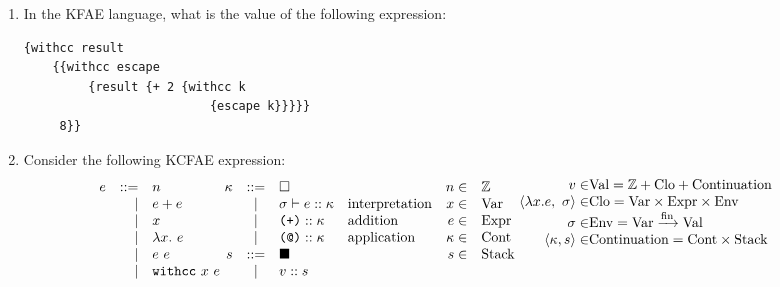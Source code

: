 \begin{enumerate}
\item In the KFAE language, what is the value of the following expression:

{
\begin{verbatim}
{withcc result
    {{withcc escape
         {result {+ 2 {withcc k
                          {escape k}}}}}
     8}}
\end{verbatim}
}

\item Consider the following KCFAE expression:
\[
\!\!\!\!\!\!\!\!
\begin{array}{l@{}l@{}l@{}l}
\begin{array}{rrl}
  e & ::= & n\\
        & | & e + e\\
        & | & x\\
        & | & \lambda x.\ e\\
        & | & e\ e\\
        & | & \mbox{\code{withcc}}\ x\ e\\
\end{array}
&
\!\!\!\!
\begin{array}{rcll}
  \kappa & ::= & \square &\\
        & | & \sigma \vdash e :: \kappa &\mbox{interpretation}\\
        & | & \mtt{(+)} :: \kappa &\mbox{addition}\\
        & | & \mtt{(@)} :: \kappa &\mbox{application}\\
s      & ::= &  \blacksquare &\mbox{}\\
        & | & v :: s &\mbox{}\\
\end{array}
&
\begin{array}{rl@{}c@{}l}
  n \in& \mathbb{Z} &&\\
  x \in& \mbox{Var} &&\\
  e \in& \mbox{Expr}&&\\
  \kappa \in& \mbox{Cont} &&\\
 s \in&\mbox{Stack}\\\\
\end{array}
&
\!\!\!\!
\begin{array}{r@{}l@{}c@{}l}
  v \in& \mbox{Val} = \mathbb{Z} + \mbox{Clo} + \mbox{Continuation}\\
\langle\lambda x. e,\ \sigma\rangle \in& \mbox{Clo} = \mbox{Var} \times \mbox{Expr} \times \mbox{Env}\\
  \sigma \in& \mbox{Env} = \finmap{\mbox{Var}}{\mbox{Val}}\\
\langle \kappa, s\rangle \in&\mbox{Continuation} = \mbox{Cont} \times \mbox{Stack}\\\\\\
\end{array}
\end{array}
\]


\end{enumerate}
